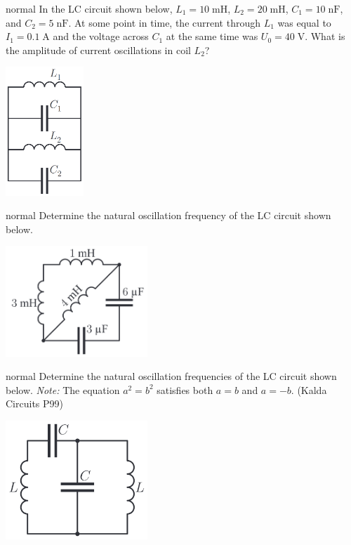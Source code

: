\hypertarget{P159}{}
\begin{solution}{normal} %
In the LC circuit shown below, $L_1=10\;\text{mH}$, $L_2=20\;\text{mH}$, $C_1=10\;\text{nF}$, and $C_2=5\;\text{nF}$. At some point in time, the current through $L_1$ was equal to $I_1=0.1\;\text{A}$ and the voltage across $C_1$ at the same time was $U_0=40\;\text{V}$. What is the amplitude of current oscillations in coil $L_2$?
\begin{center}
    \includegraphics[width=0.22\textwidth]{S6 Figures/S6-159.png}
\end{center}
\end{solution}

\hypertarget{P160}{}
\begin{solution}{normal} %
Determine the natural oscillation frequency of the LC circuit shown below.
\begin{center}
    \includegraphics[width=0.4\textwidth]{S6 Figures/S6-160.png}
\end{center}
\end{solution}

\hypertarget{P161}{}
\begin{solution}{normal} %
Determine the natural oscillation frequencies of the LC circuit shown below. \textit{Note:} The equation $a^2=b^2$ satisfies both $a=b$ and $a=-b$. (Kalda Circuits P99)
\begin{center}
    \includegraphics[width=0.4\textwidth]{S6 Figures/S6-161.png}
\end{center}
\end{solution}